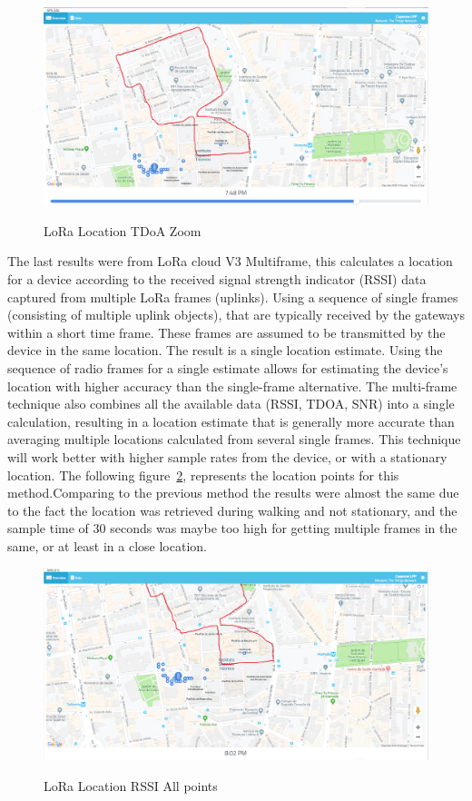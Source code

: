 \begin{figure}[htbp]
  \centering
  
    {\includegraphics[width=0.8\linewidth]{Chapters/Figures/lorageores25-1.PNG}}%
 
  \caption{LoRa Location TDoA Zoom}
  \label{fig:lora_geo_resTDOAZOM}
\end{figure}






The last results were from LoRa cloud V3 Multiframe, this calculates a location for a device according to the received signal strength indicator (RSSI) data captured from multiple LoRa frames (uplinks). Using a sequence of single frames (consisting of multiple uplink objects), that are typically received by the gateways within a short time frame. These frames are assumed to be transmitted by the device in the same location. The result is a single location estimate. Using the sequence of radio frames for a single estimate allows for estimating the device’s location with higher accuracy than the single-frame alternative. The multi-frame technique also combines all the available data (RSSI, TDOA, SNR) into a single calculation, resulting in a location estimate that is generally more accurate than averaging multiple locations calculated from several single frames. This technique will work better with higher sample rates from the device, or with a stationary location. The following figure~\ref{fig:lora_geo_multiframe}, represents the location points for this method.Comparing to the previous method the results were almost the same due to the fact the location was retrieved during walking and not stationary, and the sample time of 30 seconds was maybe too high for getting multiple frames in the same, or at least in a close location.
\begin{figure}[htbp]
  \centering
  
    {\includegraphics[width=0.8\linewidth]{Chapters/Figures/lorageores27-3.PNG}}%
 
  \caption{LoRa Location RSSI All points}
  \label{fig:lora_geo_multiframe}
\end{figure}


